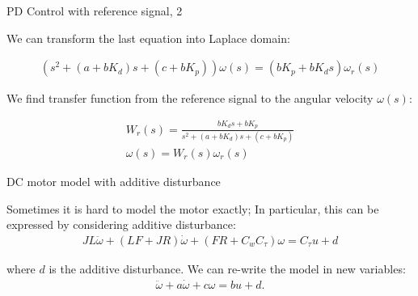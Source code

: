 \documentclass{beamer}
\begin{document}
\begin{frame}{PD Control with reference signal, 2}
	\begin{flushleft}
		
		We can transform the last equation into Laplace domain:
		
		\begin{align}
			(s^2  + (a + b K_d ) s  + (c + b K_p))\omega(s) =
			(b K_p + b K_d s) \omega_r(s)
		\end{align}
	
		We find transfer function from the reference signal to the angular velocity $\omega(s)$:
		
		\begin{align}
			W_r(s) = \frac{b K_d s + b K_p}{s^2  + (a + b K_d ) s  + (c + b K_p)} \\
			\omega(s) = W_r(s) \omega_r(s)
		\end{align}
		
	\end{flushleft}
\end{frame}



\begin{frame}{DC motor model with additive disturbance}
	\begin{flushleft}
		
		Sometimes it is hard to model the motor exactly; In particular, this can be expressed by considering additive disturbance:
		\begin{align}
			JL \ddot \omega  + (LF+JR) \dot \omega   +( FR+C_w C_\tau)\omega =
			C_\tau u + d
		\end{align}
		
		where $d$ is the additive disturbance. We can re-write the model in new variables:
		\begin{align}
			\ddot \omega  + a\dot \omega  + c\omega =
			b u + d.
		\end{align}
		
	\end{flushleft}
\end{frame}
\end{document}
